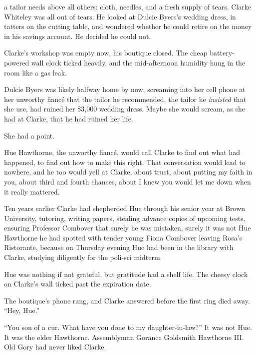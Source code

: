 \def\previewtitle{Tailor’s Tears}
\def\previewauthor{Dale Hartley Emery}

\previewannouncementpage

\previewpage

\baselinebox{\typesetchapterheading{\previewtitle}}{10}{}

\useemptypageframe

 a tailor needs above all others: cloth, needles,
and a fresh supply of tears. Clarke Whiteley was all out of tears. He
looked at Dulcie Byers’s wedding dress, in tatters on the cutting table,
and wondered whether he could retire on the money in his savings
account. He decided he could not.

Clarke’s workshop was empty now, his boutique closed. The cheap
battery-powered wall clock ticked heavily, and the mid-afternoon
humidity hung in the room like a gas leak.

Dulcie Byers was likely halfway home by now, screaming into her cell
phone at her unworthy fiancé that the tailor he recommended, the tailor
he \emph{insisted} that she use, had ruined her \$3,000 wedding dress.
Maybe she would scream, as she had at Clarke, that he had ruined her
life.

She had a point.

Hue Hawthorne, the unworthy fiancé, would call Clarke to find out what
had happened, to find out how to make this right. That conversation
would lead to nowhere, and he too would yell at Clarke, about trust,
about putting my faith in you, about third and fourth chances, about I
knew you would let me down when it really mattered.

Ten years earlier Clarke had shepherded Hue through his senior year at
Brown University, tutoring, writing papers, stealing advance copies of
upcoming tests, ensuring Professor Combover that surely he was mistaken,
surely it was not Hue Hawthorne he had spotted with tender young Fiona
Combover leaving Rosa’s Ristorante, because on Thursday evening Hue had
been in the library with Clarke, studying diligently for the poli-sci
midterm.

Hue was nothing if not grateful, but gratitude had a shelf life. The
cheesy clock on Clarke’s wall ticked past the expiration date.

The boutique’s phone rang, and Clarke answered before the first ring
died away. “Hey, Hue.”

“You son of a cur. What have you done to my daughter-in-law?” It was not
Hue. It was the elder Hawthorne. Assemblyman Gorance Goldsmith Hawthorne
III. Old Gory had never liked Clarke.

